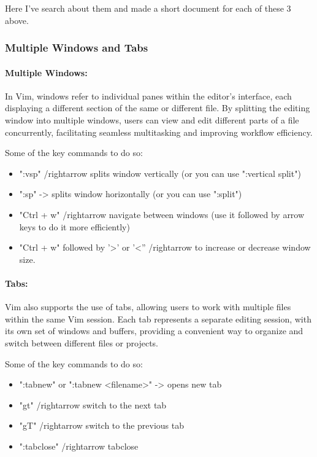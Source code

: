 \documentclass{article}
\begin{document}
	Here I've search about them and made a short document for each of these 3 above.

	\subsubsection{Multiple Windows and Tabs}
	\paragraph{Multiple Windows:} In Vim, windows refer to individual panes within the editor's interface, each displaying a different section of the same or different file.
	By splitting the editing window into multiple windows, users can view and edit different parts of a file concurrently, facilitating seamless multitasking and improving workflow efficiency.

	Some of the key commands to do so:
	\begin{itemize}
		\item ":vsp" /rightarrow splits window vertically (or you can use ":vertical split")
		\item ":sp" -> splits window horizontally (or you can use ":split")
		\item "Ctrl + w" /rightarrow navigate between windows (use it followed by arrow keys to do it more efficiently)
		\item "Ctrl + w" followed by '>' or '<'' /rightarrow to increase or decrease window size.
	\end{itemize}

	\paragraph{Tabs:} Vim also supports the use of tabs, allowing users to work with multiple files within the same Vim session.
	Each tab represents a separate editing session, with its own set of windows and buffers, providing a convenient way to organize and
	switch between different files or projects.

	Some of the key commands to do so:
	\begin{itemize}
		\item ":tabnew" or ":tabnew <filename>" -> opens new tab
		\item "gt" /rightarrow switch to the next tab
		\item "gT" /rightarrow switch to the previous tab
		\item ":tabclose" /rightarrow tabclose
	\end{itemize}
\end{document}
